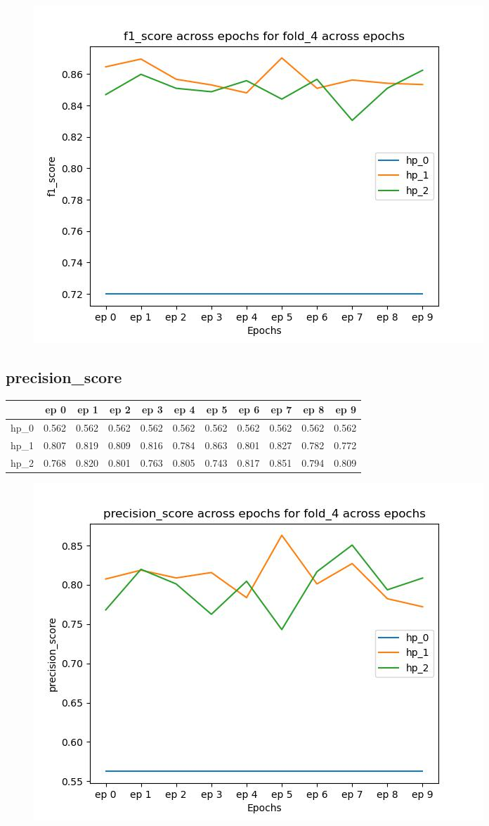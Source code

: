 \documentclass{article}
\begin{document}
\begin{figure}[H]
\includegraphics[scale = 0.75]{fold_4/f1_score}
\end{figure}
\subsection{precision\_score}
\begin{tabular}{lrrrrrrrrrr}
\toprule
{} &   ep 0 &   ep 1 &   ep 2 &   ep 3 &   ep 4 &   ep 5 &   ep 6 &   ep 7 &   ep 8 &   ep 9 \\
\midrule
hp\_0 &  0.562 &  0.562 &  0.562 &  0.562 &  0.562 &  0.562 &  0.562 &  0.562 &  0.562 &  0.562 \\
hp\_1 &  0.807 &  0.819 &  0.809 &  0.816 &  0.784 &  0.863 &  0.801 &  0.827 &  0.782 &  0.772 \\
hp\_2 &  0.768 &  0.820 &  0.801 &  0.763 &  0.805 &  0.743 &  0.817 &  0.851 &  0.794 &  0.809 \\
\bottomrule
\end{tabular}

\begin{figure}[H]
\includegraphics[scale = 0.75]{fold_4/precision_score}
\end{figure}
\end{document}

